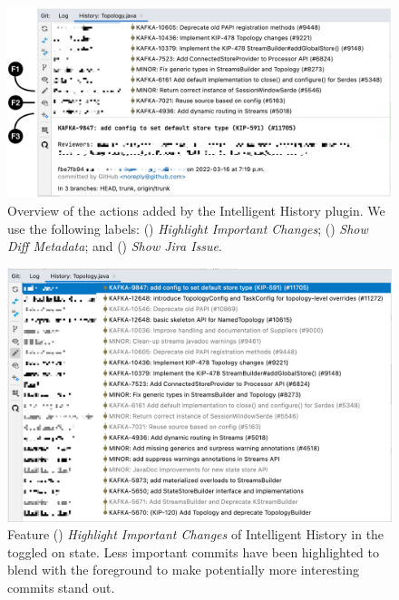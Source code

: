 \begin{figure}
    \includegraphics[width=\textwidth]{./images/intelligent-history-overview.png}
    \caption{
        Overview of the actions added by the Intelligent History plugin. We use the following labels: () \textit{Highlight Important Changes}; () \textit{Show Diff Metadata}; and () \textit{Show Jira Issue}.
    }
    \label{fig:Intelligent-History-Overview}
\end{figure}

\begin{figure}
    \includegraphics[width=\textwidth]{./images/intelligent-history-A.png}
    \caption{
        Feature () \textit{Highlight Important Changes} of Intelligent History in the toggled on state. Less important commits have been highlighted to blend with the foreground to make potentially more interesting commits stand out.
    }
    \label{fig:Intelligent-History-A}
\end{figure}

